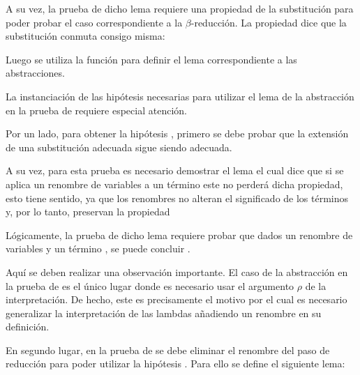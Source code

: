 
A su vez, la prueba de dicho lema requiere una propiedad de la substitución para poder probar el caso correspondiente a la $\beta$-reducción.
La propiedad  dice que la substitución conmuta consigo misma:


Luego se utiliza la función  para definir el lema correspondiente a las abstracciones.


La instanciación de las hipótesis necesarias para utilizar el lema de la abstracción en la prueba de  requiere especial atención.

Por un lado, para obtener la hipótesis \snstar {}, primero se debe probar que la extensión de una substitución adecuada sigue siendo adecuada.


A su vez, para esta prueba es necesario demostrar el lema  el cual dice que si se aplica un renombre de variables a un término \snstar este no perderá dicha propiedad, esto tiene sentido, ya que los renombres no alteran el significado de los términos y, por lo tanto, preservan la propiedad \snstar


Lógicamente, la prueba de dicho lema requiere probar que dados un renombre de variables \bound{$\rho$} y un término , se puede concluir .


Aquí se deben realizar una observación importante.
El caso de la abstracción en la prueba de  es el único lugar donde es necesario usar el argumento $\rho$ de la interpretación.
De hecho, este es precisamente el motivo por el cual es necesario generalizar la interpretación de las lambdas añadiendo un renombre en su definición.

\iffalse
En segundo lugar, en la prueba de  se debe eliminar el renombre del paso de reducción para poder utilizar la hipótesis .
Para ello se define el siguiente lema:


